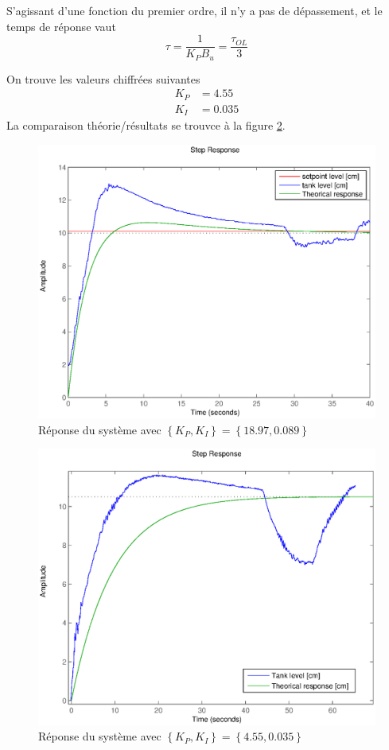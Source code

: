 \documentclass[frenchb, paper=a4, fontsize=11pt]{scrartcl}
\numberwithin{equation}{section}					%
\numberwithin{figure}{section}					%
\numberwithin{table}{section}						%
\begin{document}
S'agissant d'une fonction du premier ordre, il n'y a pas de dépassement, et le temps de réponse vaut 
\begin{equation}
\tau = \frac{1}{K_P B_u} = \frac{\tau_{OL}}{3} 
\end{equation}

On trouve les valeurs chiffrées suivantes
\begin{align}
K_P &= 4.55\\
K_I &= 0.035
\end{align}
La comparaison théorie/résultats se trouvce à la figure \ref{fig:final_values_2}.

\begin{figure}[!ht]
	\centering
	\includegraphics[width=0.8\linewidth]{img/cl_ultimate_without_simplification.eps}
	\caption{Réponse du système avec $\left\{K_P,K_I \right \} = \left\{18.97,0.089\right\}$}
	\label{fig:final_values_1}
\end{figure}

\begin{figure}[!ht]
	\centering
	\includegraphics[width=0.8\linewidth]{img/cl_ultimate.eps}
	\caption{Réponse du système avec $\left\{K_P,K_I \right \} = \left\{4.55,0.035\right\}$}
	\label{fig:final_values_2}
\end{figure}
\end{document}
